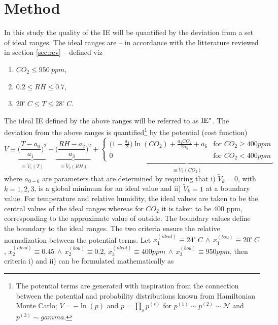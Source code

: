 \documentclass[fleqn,usenatbib,nofootinbib]{revtex4-2}
\begin{document}
	\section{Method}
	\label{sec:method}
	In this study the quality of the IE will be quantified by the deviation from a set of ideal ranges. The ideal ranges are -- in accordance with the litterature reviewed in section \ref{sec:rev} -- defined viz
	\begin{enumerate}
		\item $CO_2\leq 950 \ ppm$,
		\item $0.2\leq RH \leq 0.7$,
		\item $20^\circ\ C \leq T \leq 28 ^\circ\ C$.
	\end{enumerate}
	The ideal IE defined by the above ranges will be referred to as $\rm IE^*$. The deviation from the above ranges is quantified\footnote{The potential terms are generated with inspiration from the connection between the potential and probability distributions known from Hamiltonian Monte Carlo; $V=-\ln(p)$ and $p=\prod_sp^{(s)}$ for $p^{(1)}\sim p^{(2)}\sim \mathcal{N}$ and $p^{(3)}\sim gamma$.} by the potential (cost function)
	\begin{equation}
			V \equiv \underbrace{\bigg(\frac{T-a_0}{a_1}\bigg)^2}_{\equiv \tilde{V}_1(T)}+\underbrace{\bigg(\frac{RH-a_2}{a_3}\bigg)^2}_{\equiv \tilde{V}_2(RH)}+\underbrace{\begin{cases}
				\big(1-\frac{a_4}{2}\big)\ln(CO_{2})+\frac{a_4CO_{2}}{2a_5}+a_6 & \text{for }  CO_2 \geq 400 ppm\\
				0 & \text{for }  CO_2 < 400 ppm
			\end{cases}}_{\equiv \tilde{V}_3(CO_2)}
			\label{eq:pot}
	\end{equation}
	where $a_{0-6}$ are parameters that are determined by requiring that i) $\tilde{V}_{k} =0$, with $k=1,2,3$, is a global minimum for an ideal value and ii) $\tilde{V}_k=1$ at a boundary value. For temperature and relative humidity, the ideal values are taken to be the central values of the ideal ranges whereas for $CO_2$ it is taken to be $400$ ppm, corresponding to the approximate value of outside. The boundary values define the boundary to the ideal ranges. The two criteria ensure the relative normalization between the potential terms. Let $x_1^{(ideal)} \equiv 24^\circ \ C \, \wedge \, x_1^{(bou)} \equiv  20^\circ \ C $, $x_2^{(ideal)} \equiv 0.45 \, \wedge \, x_2^{(bou)} \equiv  0.2$, $x_3^{(ideal)} \equiv 400 ppm \, \wedge \, x_3^{(bou)} \equiv  950 ppm$, then criteria i) and ii) can be formulated mathematically as	
\end{document}
